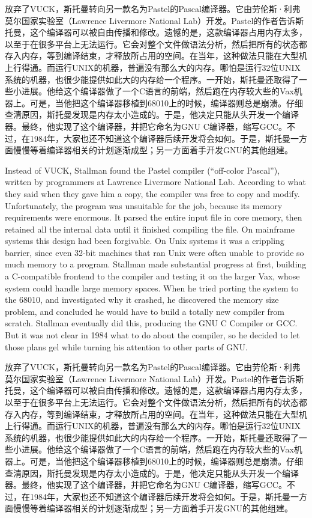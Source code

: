 \ifdefined\chs
放弃了VUCK，斯托曼转向另一款名为Pastel的Pascal编译器。它由劳伦斯·利弗莫尔国家实验室（Lawrence Livermore National Lab）开发。Pastel的作者告诉斯托曼，这个编译器可以被自由传播和修改。遗憾的是，这款编译器占用内存太多，以至于在很多平台上无法运行。它会对整个文件做语法分析，然后把所有的状态都存入内存，等到编译结束，才释放所占用的空间。在当年，这种做法只能在大型机上行得通。而运行UNIX的机器，普遍没有那么大的内存。哪怕是运行32位UNIX系统的机器，也很少能提供如此大的内存给一个程序。一开始，斯托曼还取得了一些小进展。他给这个编译器做了一个C语言的前端，然后跑在内存较大些的Vax机器上。可是，当他把这个编译器移植到68010上的时候，编译器则总是崩溃。仔细查清原因，斯托曼发现是内存太小造成的。于是，他决定只能从头开发一个编译器。最终，他实现了这个编译器，并把它命名为GNU C编译器，缩写GCC。不过，在1984年，大家也还不知道这个编译器后续开发将会如何。于是，斯托曼一方面慢慢等着编译器相关的计划逐渐成型；另一方面着手开发GNU的其他组建。
\fi
\fi

\ifdefined\vtwo
\ifdefined\eng
Instead of VUCK, Stallman found the Pastel compiler (``off-color Pascal''), written by programmers at Lawrence Livermore National Lab. According to what they said when they gave him a copy, the compiler was free to copy and modify. Unfortunately, the program was unsuitable for the job, because its memory requirements were enormous.  It parsed the entire input file in core memory, then retained all the internal data until it finished compiling the file. On mainframe systems this design had been forgivable. On Unix systems it was a crippling barrier, since even 32-bit machines that ran Unix were often unable to provide so much memory to a program. Stallman made substantial progress at first, building a C-compatible frontend to the compiler and testing it on the larger Vax, whose system could handle large memory spaces. When he tried porting the system to the 68010, and investigated why it crashed,  he discovered the memory size problem, and concluded he would have to build a totally new compiler from scratch.  Stallman eventually did this, producing the GNU C Compiler or GCC.  But it was not clear in 1984 what to do about the compiler, so he decided to let those plans gel while turning his attention to other parts of GNU.
\fi

\ifdefined\chs
放弃了VUCK，斯托曼转向另一款名为Pastel的Pascal编译器。它由劳伦斯·利弗莫尔国家实验室（Lawrence Livermore National Lab）开发。Pastel的作者告诉斯托曼，这个编译器可以被自由传播和修改。遗憾的是，这款编译器占用内存太多，以至于在很多平台上无法运行。它会对整个文件做语法分析，然后把所有的状态都存入内存，等到编译结束，才释放所占用的空间。在当年，这种做法只能在大型机上行得通。而运行UNIX的机器，普遍没有那么大的内存。哪怕是运行32位UNIX系统的机器，也很少能提供如此大的内存给一个程序。一开始，斯托曼还取得了一些小进展。他给这个编译器做了一个C语言的前端，然后跑在内存较大些的Vax机器上。可是，当他把这个编译器移植到68010上的时候，编译器则总是崩溃。仔细查清原因，斯托曼发现是内存太小造成的。于是，他决定只能从头开发一个编译器。最终，他实现了这个编译器，并把它命名为GNU C编译器，缩写GCC。不过，在1984年，大家也还不知道这个编译器后续开发将会如何。于是，斯托曼一方面慢慢等着编译器相关的计划逐渐成型；另一方面着手开发GNU的其他组建。
\fi
\fi

